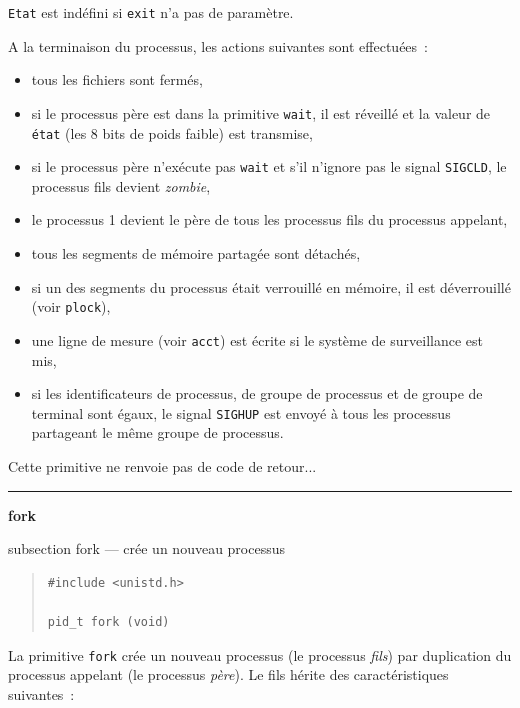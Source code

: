 \documentclass [twoside] {report}
\newcommand {\primitive} [1]
    {
	\phantomsection
	{\large \textbf {#1}}
	\addcontentsline {toc} {subsection} {#1}
    }
\newcommand {\separation}
    {
	\vspace {5mm}
	\nopagebreak
	\hrule
    }
\begin{document}
\texttt {Etat} est indéfini si \texttt {exit} n'a pas de
paramètre.

A la terminaison du processus, les actions
suivantes sont effectuées~:

\begin {itemize}
\item tous les fichiers sont fermés,
\item si le processus père est dans la primitive
\texttt {wait}, il est réveillé et la valeur de \texttt {état}
(les 8 bits de poids faible) est transmise,
\item si le processus père n'exécute pas \texttt {wait} et
s'il n'ignore pas le signal \texttt {SIGCLD}, le
processus fils devient \textit {zombie},
\item le processus 1 devient le père de tous les
processus fils du processus appelant,
\item tous les segments de mémoire partagée sont
détachés,
\item si un des segments du processus était
verrouillé en mémoire, il est déverrouillé (voir
\texttt {plock}),
\item une ligne de mesure (voir \texttt {acct}) est écrite
si le système de surveillance est mis,
\item si les identificateurs de processus, de groupe
de processus et de groupe de terminal sont égaux,
le signal \texttt {SIGHUP} est envoyé à tous les
processus partageant le même groupe de
processus.
\end {itemize}

Cette primitive ne renvoie pas de code de
retour...




\separation
\primitive {fork} --- crée un nouveau processus

\begin {quote}
\begin {verbatim}
#include <unistd.h>

pid_t fork (void)
\end{verbatim}
\end {quote}

La primitive \texttt {fork} crée un nouveau processus
(le processus \textit {fils})
par duplication du processus appelant (le
processus \textit {père}). Le fils hérite des
caractéristiques suivantes~:
\end{document}
